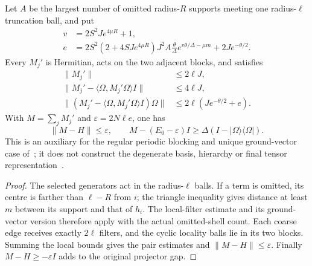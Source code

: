 \begin{lemma}
    Let $A$ be the largest number of omitted radius-$R$ supports meeting
    one radius-$\ell$ truncation ball, and put
    \begin{align*}
        v & =2S^2J e^{4\mu R}+1,                         \\
        e & =2S^2(2+4SJ e^{4\mu R})J^2A\frac\theta\Delta
        e^{v\theta/\Delta-\mu m}+2Je^{-\theta/2}.
    \end{align*}
    Every $M_j'$ is Hermitian, acts on the two adjacent blocks, and satisfies
    \begin{align*}
        \|M_j'\|                                   & \le2\ell J,                 \\
        \|M_j'-\langle\Omega,M_j'\Omega\rangle I\| & \le4\ell J,                 \\
        \|(M_j'-\langle\Omega,M_j'\Omega\rangle I)\Omega\|
                                                   & \le2\ell(Je^{-\theta/2}+e).
    \end{align*}
    With $M=\sum_jM_j'$ and $\varepsilon=2N\ell e$, one has
    \[
        \|M-H\|\le\varepsilon,\qquad
        M-(E_0-\varepsilon)I\ge\Delta(I-|\Omega\rangle\langle\Omega|).
    \]
    This is an auxiliary for the regular periodic blocking and unique
    ground-vector case of~\cite[lines 285--387 and 609--639]{Hastings2006Solving};
    it does not construct the degenerate basis, hierarchy or final tensor
    representation~\cite{gap:hastings05_physical_periodic_pairs}.
\end{lemma}
\begin{proof}\leanok
    The selected generators act in the radius-$\ell$ balls. If a term is
    omitted, its centre is farther than $\ell-R$ from $i$; the triangle
    inequality gives distance at least $m$ between its support and that
    of $h_i$. The local-filter estimate and its ground-vector version
    therefore apply with the actual omitted-shell count. Each coarse
    edge receives exactly $2\ell$ filters, and the cyclic locality balls
    lie in its two blocks. Summing the local bounds gives the pair
    estimates and $\|M-H\|\le\varepsilon$. Finally
    $M-H\ge-\varepsilon I$ adds to the original projector gap.
\end{proof}
